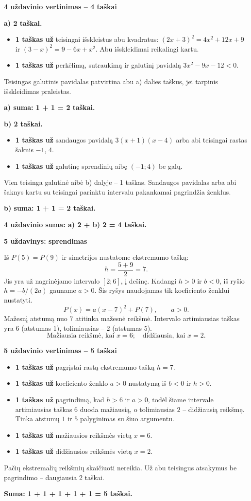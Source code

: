 \documentclass[11pt]{article}
\newcommand{\sk}[1]{\par\medskip\textbf{#1}\par}
\begin{document}
\sk{4 uždavinio vertinimas -- 4 taškai}
\textbf{a) 2 taškai.}\begin{itemize}
\item \textbf{1 taškas už} teisingai išskleistus abu kvadratus: $(2x+3)^2=4x^2+12x+9$ ir $(3-x)^2=9-6x+x^2$. Abu išskleidimai reikalingi kartu.
\item \textbf{1 taškas už} perkėlimą, sutraukimą ir galutinį pavidalą $3 x^{2} - 9 x - 12<0$.
\end{itemize}
Teisingas galutinis pavidalas patvirtina abu a) dalies taškus, jei tarpinis išskleidimas praleistas.\par\textbf{a) suma: 1 + 1 = 2 taškai.}\par\textbf{b) 2 taškai.}\begin{itemize}
\item \textbf{1 taškas už} sandaugos pavidalą $3(x+1)(x-4)$ arba abi teisingai rastas šaknis $-1$, $4$.
\item \textbf{1 taškas už} galutinę sprendinių aibę $(-1;4)$ be galų.
\end{itemize}
Vien teisinga galutinė aibė b) dalyje -- 1 taškas. Sandaugos pavidalas arba abi šaknys kartu su teisingai parinktu intervalu pakankamai pagrindžia ženklus.\par\textbf{b) suma: 1 + 1 = 2 taškai.}\par\textbf{4 uždavinio suma: a) 2 + b) 2 = 4 taškai.}\newpage

\sk{5 uždavinys: sprendimas}
Iš $P(5)=P(9)$ ir simetrijos nustatome ekstremumo tašką:
\[h=\frac{5+9}2=7.\]
Jis yra už nagrinėjamo intervalo $[2;6]$, į dešinę. Kadangi $h>0$ ir $b<0$, iš ryšio $h=-b/(2a)$ gauname $a>0$. Šis ryšys naudojamas tik koeficiento ženklui nustatyti.
\[P(x)=a(x-7)^2+P(7),\qquad a>0.\]
Mažesnį atstumą nuo $7$ atitinka mažesnė reikšmė. Intervalo artimiausias taškas yra $6$ (atstumas $1$), tolimiausias -- $2$ (atstumas $5$).
\[\boxed{\text{Mažiausia reikšmė, kai }x=6;\quad\text{didžiausia, kai }x=2.}\]

\sk{5 uždavinio vertinimas -- 5 taškai}
\begin{itemize}
\item \textbf{1 taškas už} pagrįstai rastą ekstremumo tašką $h=7$.
\item \textbf{1 taškas už} koeficiento ženklo $a>0$ nustatymą iš $b<0$ ir $h>0$.
\item \textbf{1 taškas už} pagrindimą, kad $h>6$ ir $a>0$, todėl šiame intervale artimiausias taškas $6$ duoda mažiausią, o tolimiausias $2$ -- didžiausią reikšmę. Tinka atstumų $1$ ir $5$ palyginimas su šiuo argumentu.
\item \textbf{1 taškas už} mažiausios reikšmės vietą $x=6$.
\item \textbf{1 taškas už} didžiausios reikšmės vietą $x=2$.
\end{itemize}
Pačių ekstremalių reikšmių skaičiuoti nereikia. Už abu teisingus atsakymus be pagrindimo -- daugiausia 2 taškai.\par\textbf{Suma: 1 + 1 + 1 + 1 + 1 = 5 taškai.}
\end{document}
